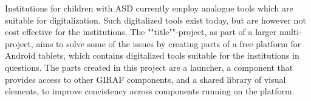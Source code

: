 Institutions for children with ASD currently employ analogue tools which are suitable for digitalization.
Such digitalized tools exist today, but are however not cost effective for the institutions.
The ""title""-project, as part of a larger multi-project, aims to solve some of the issues by creating parts of a free platform for Android\texttrademark  \hspace{1pt} tablets, which contains digitalized tools suitable for the institutions in questions.
The parts created in this project are a launcher, a component that provides access to other GIRAF components, and a shared library of visual elements, to improve concistency across components running on the platform.